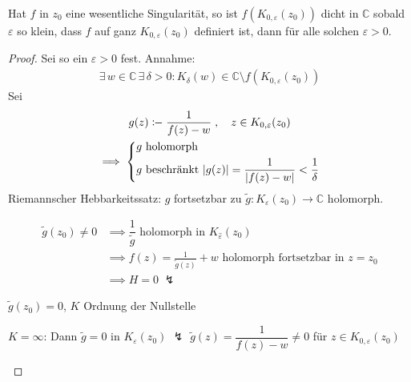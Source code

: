 \documentclass[a4paper,10pt]{scrbook}
\begin{document}
\begin{theorem}
  Hat $f$ in $z_0$ eine wesentliche Singularität, so ist $f(K_{0,\varepsilon}(z_0))$ dicht in $\mathbb{C}$ sobald $\varepsilon$ so klein, dass $f$ auf ganz $K_{0,\varepsilon}(z_0)$ definiert ist, dann für alle solchen $\varepsilon > 0$.
  \begin{proof}
    Sei so ein $\varepsilon > 0$ fest. Annahme:
    \begin{align*}
      \exists \, w \in \mathbb{C} \, \exists \, \delta > 0 : K_\delta(w) \in \mathbb{C} \setminus f(K_{0,\varepsilon}(z_0))
    \end{align*}
    Sei
    \begin{gather*}
      g(z) \coloneq \frac{1}{f(z) - w} \; , \quad z \in K_{0,\varepsilon}(z_0) \\
      \implies
      \begin{dcases}
        g \text{ holomorph} \\
        g \text{ beschränkt } |g(z)| = \frac{1}{|f(z) - w|} < \frac{1}{\delta}
      \end{dcases}
    \end{gather*}
    Riemannscher Hebbarkeitssatz: $g$ fortsetzbar zu $\widetilde{g} : K_\varepsilon(z_0) \to \mathbb{C}$ holomorph.


    \begin{align*}
      \widetilde{g}(z_0) \neq 0
      &\implies \dfrac{1}{\widetilde{g}} \text{ holomorph in } K_{\widehat{\varepsilon}}(z_0) \\
      &\implies f(z) = \frac{1}{\widetilde{g}(z)} + w \text{ holomorph fortsetzbar in } z = z_0 \\
      &\implies H = 0 \; \lightning
    \end{align*}


    $\widetilde{g}(z_0) = 0$, $K$ Ordnung der Nullstelle

    \begin{enum-alph}
      \item $K = \infty$: Dann $\widetilde{g} = 0$ in $K_\varepsilon(z_0)$ $\lightning$ $\widetilde{g}(z)=\dfrac{1}{f(z)-w} \neq 0$ für $z \in K_{0,\varepsilon}(z_0)$


\end{enum-alph}
\end{proof}
\end{theorem}
\end{document}
